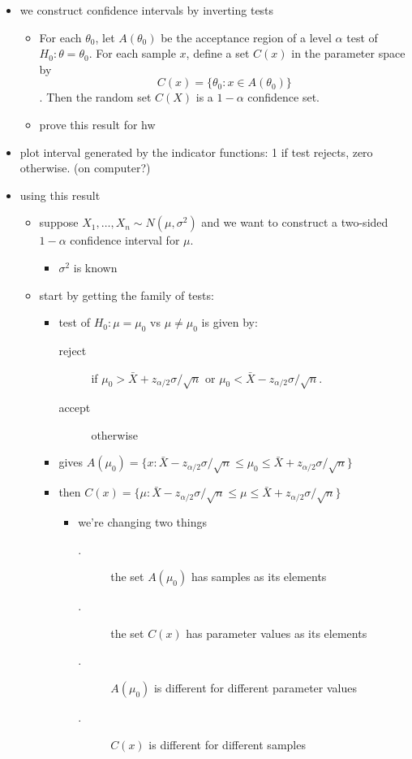 \begin{itemize}
\item we construct confidence intervals by inverting tests
  \citep[Section 9.2]{CaB_2001}
\begin{itemize}
\item For each $\theta_0$, let $A(\theta_0)$ be the acceptance region
        of a level $\alpha$ test of $H_0: \theta = \theta_0$.  For each
        sample $x$, define a set $C(x)$ in the parameter space
        by \[C(x) = \{\theta_0: x \in A(\theta_0)\}\].  Then the random
        set $C(X)$ is a $1-\alpha$ confidence set.
\item prove this result for hw
\end{itemize}
\item plot interval generated by the indicator functions: 1 if test
      rejects, zero otherwise. (on computer?)
\item using this result
\begin{itemize}
\item suppose $X_1,\dots,X_n \sim N(\mu,\sigma^2)$ and we want to
        construct a two-sided $1-\alpha$ confidence interval for $\mu$.
\begin{itemize}
\item $\sigma^2$ is known
\end{itemize}
\item start by getting the family of tests:
\begin{itemize}
\item test of $H_0: \mu = \mu_0$ vs $\mu \neq \mu_0$ is given by:
\begin{description}
\item[reject] if $\mu_0 > \bar X + z_{\alpha/2}
                      \sigma / \sqrt{n}$ or $\mu_0 < \bar X - 
                      z_{\alpha/2} \sigma / \sqrt{n}$.
\item[accept] otherwise
\end{description}
\item gives $A(\mu_0) = \{x :\bar X - z_{\alpha/2} \sigma /
          \sqrt{n} \leq \mu_0 \leq \bar X + z_{\alpha/2} \sigma /
          \sqrt{n}\}$
\item then $C(x) = \{\mu :\bar X - z_{\alpha/2}  \sigma /
          \sqrt{n} \leq \mu \leq \bar X + z_{\alpha/2} \sigma /
          \sqrt{n}\}$
\begin{itemize}
\item we're changing two things
\begin{description}
\item[.] the set $A(\mu_0)$ has samples as its elements
\item[.] the set $C(x)$ has parameter values as its elements
\item[.] $A(\mu_0)$ is different for different parameter values
\item[.] $C(x)$ is different for different samples
\end{description}
\end{itemize}
\end{itemize}
\end{itemize}
\end{itemize}

